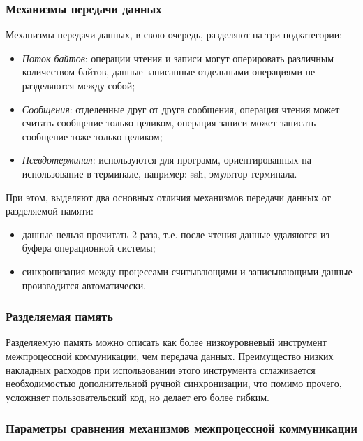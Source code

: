 \documentclass[14pt, russian]{scrartcl}
\begin{document}
\subsubsection{Механизмы передачи данных}

Механизмы передачи данных, в свою очередь, разделяют на три подкатегории:

\begin{itemize}
  \item \emph{Поток байтов}: операции чтения и записи могут оперировать
        различным количеством байтов, данные записанные отдельными операциями не
        разделяются между собой;
  \item \emph{Сообщения}: отделенные друг от друга сообщения, операция чтения
        может считать сообщение только целиком, операция записи может записать
        сообщение тоже только целиком;
  \item \emph{Псевдотерминал}: используются для программ, ориентированных на
        использование в терминале, например: ssh, эмулятор терминала.
\end{itemize}

При этом, выделяют два основных отличия механизмов передачи данных от
разделяемой памяти:

\begin{itemize}
  \item данные нельзя прочитать 2 раза, т.е. после чтения данные удаляются из
        буфера операционной системы;
  \item синхронизация между процессами считывающими и записывающими данные
        производится автоматически.
\end{itemize}

\subsubsection{Разделяемая память}

Разделяемую память можно описать как более низкоуровневый инструмент
межпроцессной коммуникации, чем передача данных. Преимущество низких накладных
расходов при использовании этого инструмента сглаживается необходимостью
дополнительной ручной синхронизации, что помимо прочего, усложняет
пользовательский код, но делает его более гибким.

\subsubsection{Параметры сравнения механизмов межпроцессной коммуникации}
\end{document}
